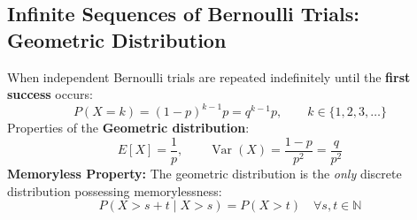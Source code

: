 \documentclass[12pt,a4paper]{article}
\begin{document}
\subsection{Infinite Sequences of Bernoulli Trials: Geometric Distribution}
When independent Bernoulli trials are repeated indefinitely until the \textbf{first success} occurs:
\begin{equation}
  P(X = k) = (1-p)^{k-1} p = q^{k-1} p, \qquad k \in \{1, 2, 3, \dots\}
\end{equation}
Properties of the \textbf{Geometric distribution}:
\begin{equation}
  E[X] = \frac{1}{p}, \qquad \operatorname{Var}(X) = \frac{1-p}{p^2} = \frac{q}{p^2}
\end{equation}
\textbf{Memoryless Property:} The geometric distribution is the \textit{only} discrete distribution possessing memorylessness:
\begin{equation}
  P(X > s + t \mid X > s) = P(X > t) \quad \forall s, t \in \mathbb{N}
\end{equation}
\end{document}
